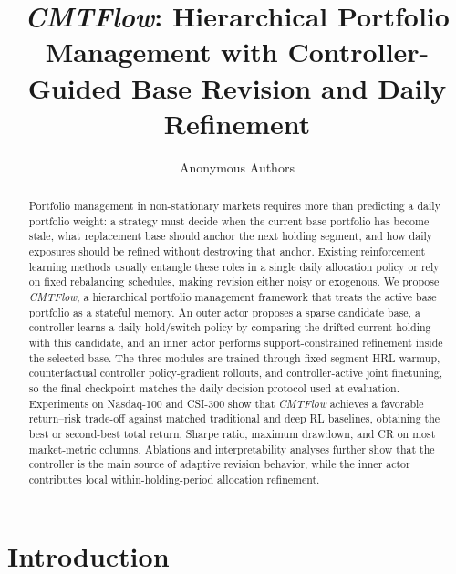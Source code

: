 \documentclass[letterpaper]{article} %
\title{\textit{CMTFlow}: Hierarchical Portfolio Management with Controller-Guided Base Revision and Daily Refinement}
\author{
    Anonymous Authors
}
\begin{document}
\maketitle

\begin{abstract}
Portfolio management in non-stationary markets requires more than predicting a daily portfolio weight: a strategy must decide when the current base portfolio has become stale, what replacement base should anchor the next holding segment, and how daily exposures should be refined without destroying that anchor. Existing reinforcement learning methods usually entangle these roles in a single daily allocation policy or rely on fixed rebalancing schedules, making revision either noisy or exogenous. We propose \textit{CMTFlow}, a hierarchical portfolio management framework that treats the active base portfolio as a stateful memory. An outer actor proposes a sparse candidate base, a controller learns a daily hold/switch policy by comparing the drifted current holding with this candidate, and an inner actor performs support-constrained refinement inside the selected base. The three modules are trained through fixed-segment HRL warmup, counterfactual controller policy-gradient rollouts, and controller-active joint finetuning, so the final checkpoint matches the daily decision protocol used at evaluation. Experiments on Nasdaq-100 and CSI-300 show that \textit{CMTFlow} achieves a favorable return--risk trade-off against matched traditional and deep RL baselines, obtaining the best or second-best total return, Sharpe ratio, maximum drawdown, and CR on most market-metric columns. Ablations and interpretability analyses further show that the controller is the main source of adaptive revision behavior, while the inner actor contributes local within-holding-period allocation refinement.
\end{abstract}

\section{Introduction}
\end{document}
